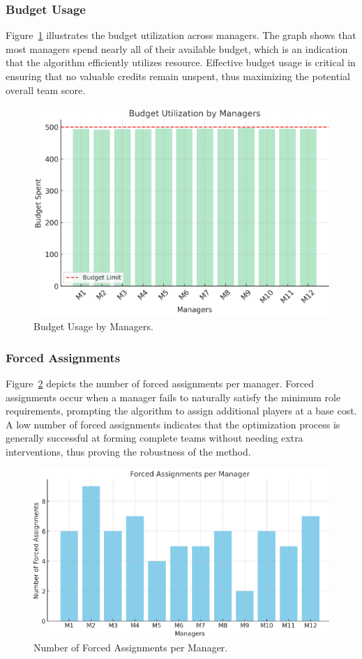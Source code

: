\documentclass[sigconf]{acmart}
\begin{document}
	\subsubsection{Budget Usage}
	Figure~\ref{fig:budget_usage} illustrates the budget utilization across managers. The graph shows that most managers spend nearly all of their available budget, which is an indication that the algorithm efficiently utilizes resource. Effective budget usage is critical in ensuring that no valuable credits remain unspent, thus maximizing the potential overall team score.
	
	\begin{figure}[H]
		\centering
		\includegraphics[width=0.8\linewidth]{plot/budget_usage.png}
		\caption{Budget Usage by Managers.}
		\label{fig:budget_usage}
	\end{figure}
	
	\subsubsection{Forced Assignments}
	Figure~\ref{fig:forced_assignments} depicts the number of forced assignments per manager. Forced assignments occur when a manager fails to naturally satisfy the minimum role requirements, prompting the algorithm to assign additional players at a base cost. A low number of forced assignments indicates that the optimization process is generally successful at forming complete teams without needing extra interventions, thus proving the robustness of the method.
	
	\begin{figure}[H]
		\centering
		\includegraphics[width=0.8\linewidth]{plot/forced_assignments.png}
		\caption{Number of Forced Assignments per Manager.}
		\label{fig:forced_assignments}
	\end{figure}
	
\end{document}
